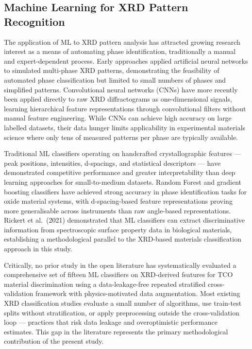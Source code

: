 \documentclass[12pt, oneside]{article} %
\begin{document}
\subsection{Machine Learning for XRD Pattern Recognition}

The application of ML to XRD pattern analysis has attracted growing research interest as a means of automating phase identification, traditionally a manual and expert-dependent process. Early approaches applied artificial neural networks to simulated multi-phase XRD patterns, demonstrating the feasibility of automated phase classification but limited to small numbers of phases and simplified patterns. Convolutional neural networks (CNNs) have more recently been applied directly to raw XRD diffractograms as one-dimensional signals, learning hierarchical feature representations through convolutional filters without manual feature engineering. While CNNs can achieve high accuracy on large labelled datasets, their data hunger limits applicability in experimental materials science where only tens of measured patterns per phase are typically available.

Traditional ML classifiers operating on handcrafted crystallographic features --- peak positions, intensities, d-spacings, and statistical descriptors --- have demonstrated competitive performance and greater interpretability than deep learning approaches for small-to-medium datasets. Random Forest and gradient boosting classifiers have achieved strong accuracy in phase identification tasks for oxide material systems, with d-spacing-based feature representations proving more generalisable across instruments than raw angle-based representations. Rickert et al.\ (2021) demonstrated that ML classifiers can extract discriminative information from spectroscopic surface property data in biological materials, establishing a methodological parallel to the XRD-based materials classification approach in this study.

Critically, no prior study in the open literature has systematically evaluated a comprehensive set of fifteen ML classifiers on XRD-derived features for TCO material discrimination using a data-leakage-free repeated stratified cross-validation framework with physics-motivated data augmentation. Most existing XRD classification studies evaluate a small number of algorithms, use train-test splits without stratification, or apply preprocessing outside the cross-validation loop --- practices that risk data leakage and overoptimistic performance estimates. This gap in the literature represents the primary methodological contribution of the present study.
\end{document}
